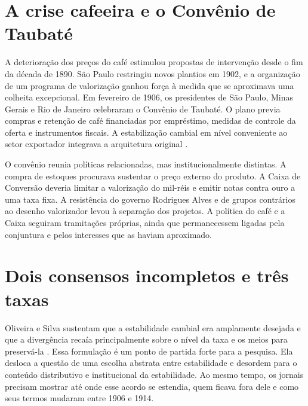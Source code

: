\section{A crise cafeeira e o Convênio de Taubaté}

A deterioração dos preços do café estimulou propostas de intervenção desde o fim da década de 1890. São Paulo restringiu novos plantios em 1902, e a organização de um programa de valorização ganhou força à medida que se aproximava uma colheita excepcional. Em fevereiro de 1906, os presidentes de São Paulo, Minas Gerais e Rio de Janeiro celebraram o Convênio de Taubaté. O plano previa compras e retenção de café financiadas por empréstimo, medidas de controle da oferta e instrumentos fiscais. A estabilização cambial em nível conveniente ao setor exportador integrava a arquitetura original \cite{holloway1978,torelli2004,francolago2011}.

O convênio reunia políticas relacionadas, mas institucionalmente distintas. A compra de estoques procurava sustentar o preço externo do produto. A Caixa de Conversão deveria limitar a valorização do mil-réis e emitir notas contra ouro a uma taxa fixa. A resistência do governo Rodrigues Alves e de grupos contrários ao desenho valorizador levou à separação dos projetos. A política do café e a Caixa seguiram tramitações próprias, ainda que permanecessem ligadas pela conjuntura e pelos interesses que as haviam aproximado.

\section{Dois consensos incompletos e três taxas}

Oliveira e Silva sustentam que a estabilidade cambial era amplamente desejada e que a divergência recaía principalmente sobre o nível da taxa e os meios para preservá-la \cite{oliveirasilva2001}. Essa formulação é um ponto de partida forte para a pesquisa. Ela desloca a questão de uma escolha abstrata entre estabilidade e desordem para o conteúdo distributivo e institucional da estabilidade. Ao mesmo tempo, os jornais precisam mostrar até onde esse acordo se estendia, quem ficava fora dele e como seus termos mudaram entre 1906 e 1914.

